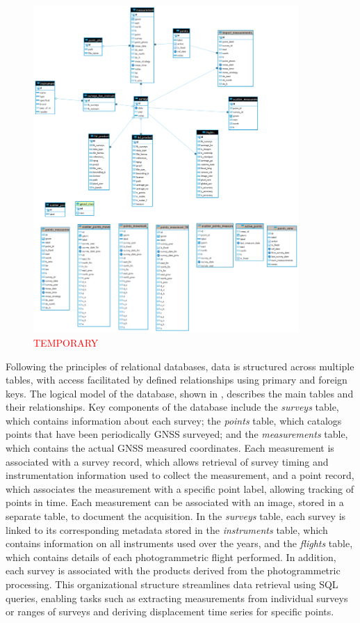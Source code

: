 \begin{figure}[ht!]
  \centering
  \includegraphics[width=0.9\textwidth]{belvederedb_erd.png}
  \caption{\textcolor{red}{TEMPORARY}}
  \label{fig:3:belvederedb_erd}
\end{figure}

Following the principles of relational databases, data is structured across multiple tables, with access facilitated by defined relationships using primary and foreign keys. 
The logical model of the database, shown in , describes the main tables and their relationships.
Key components of the database include the \textit{surveys} table, which contains information about each survey; the \textit{points} table, which catalogs points that have been periodically GNSS surveyed; and the \textit{measurements} table, which contains the actual GNSS measured coordinates. 
Each measurement is associated with a survey record, which allows retrieval of survey timing and instrumentation information used to collect the measurement, and a point record, which associates the measurement with a specific point label, allowing tracking of points in time.
Each measurement can be associated with an image, stored in a separate table, to document the acquisition.
In the \textit{surveys} table, each survey is linked to its corresponding metadata stored in the \textit{instruments} table, which contains information on all instruments used over the years, and the \textit{flights} table, which contains details of each photogrammetric flight performed.
In addition, each survey is associated with the products derived from the photogrammetric processing.
This organizational structure streamlines data retrieval using SQL queries, enabling tasks such as extracting measurements from individual surveys or ranges of surveys and deriving displacement time series for specific points.

